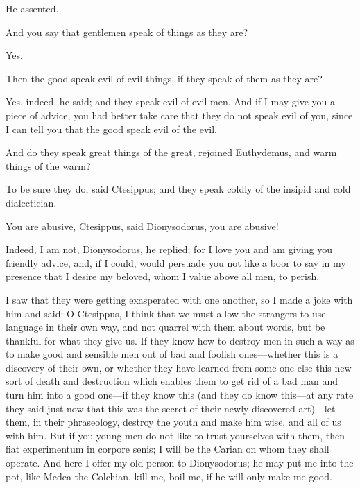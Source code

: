 \documentclass[11pt,letter]{article}
\begin{document}
\par  He assented.

\par  And you say that gentlemen speak of things as they are?

\par  Yes.

\par  Then the good speak evil of evil things, if they speak of them as they are?

\par  Yes, indeed, he said; and they speak evil of evil men. And if I may give you a piece of advice, you had better take care that they do not speak evil of you, since I can tell you that the good speak evil of the evil.

\par  And do they speak great things of the great, rejoined Euthydemus, and warm things of the warm?

\par  To be sure they do, said Ctesippus; and they speak coldly of the insipid and cold dialectician.

\par  You are abusive, Ctesippus, said Dionysodorus, you are abusive!

\par  Indeed, I am not, Dionysodorus, he replied; for I love you and am giving you friendly advice, and, if I could, would persuade you not like a boor to say in my presence that I desire my beloved, whom I value above all men, to perish.

\par  I saw that they were getting exasperated with one another, so I made a joke with him and said: O Ctesippus, I think that we must allow the strangers to use language in their own way, and not quarrel with them about words, but be thankful for what they give us. If they know how to destroy men in such a way as to make good and sensible men out of bad and foolish ones—whether this is a discovery of their own, or whether they have learned from some one else this new sort of death and destruction which enables them to get rid of a bad man and turn him into a good one—if they know this (and they do know this—at any rate they said just now that this was the secret of their newly-discovered art)—let them, in their phraseology, destroy the youth and make him wise, and all of us with him. But if you young men do not like to trust yourselves with them, then fiat experimentum in corpore senis; I will be the Carian on whom they shall operate. And here I offer my old person to Dionysodorus; he may put me into the pot, like Medea the Colchian, kill me, boil me, if he will only make me good.
\end{document}
